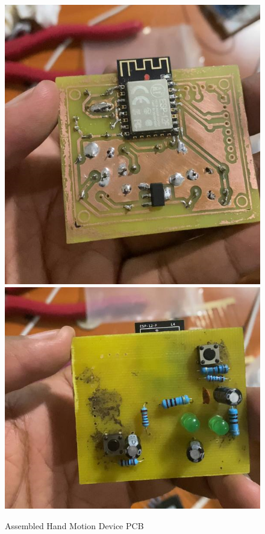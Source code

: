 \begin{figure}[H]
    \centering
    \includegraphics[scale = 0.4]{Figures/handMotionFront.png}
    \includegraphics[scale = 0.4]{Figures/handMotionBack.png}
    \caption{Assembled Hand Motion Device \ac{PCB}}
    \label{fig:handMotionAssembly}
\end{figure}

